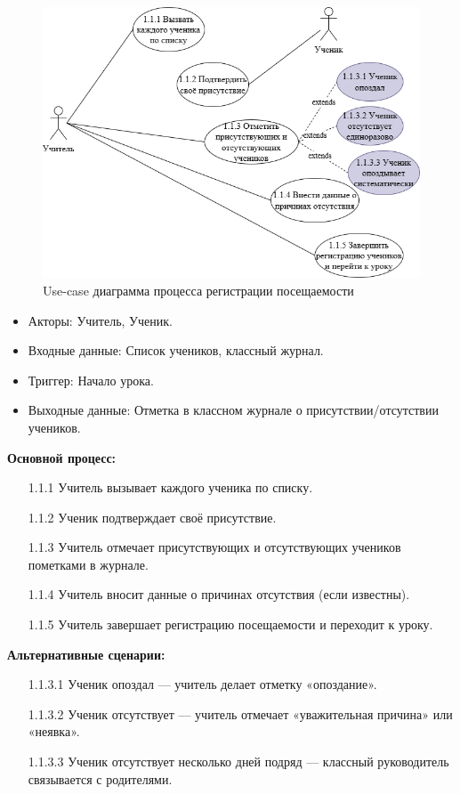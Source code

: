 \documentclass[a4paper, final]{article}
\begin{document}
\begin{figure}[H]
   \centering
   \includegraphics[width=\linewidth]{use_case31.png}
   \caption{Use-case диаграмма процесса регистрации посещаемости}
   \label{img:use_case31}
\end{figure}

\begin{itemize}
  \item Акторы: Учитель, Ученик.
  \item Входные данные: Список учеников, классный журнал.
  \item Триггер: Начало урока.
  \item Выходные данные: Отметка в классном журнале о присутствии/отсутствии учеников.
\end{itemize}

\textbf{Основной процесс:}
\begin{enumerate}
  \item[1.1.1] Учитель вызывает каждого ученика по списку.
  \item[1.1.2] Ученик подтверждает своё присутствие.
  \item[1.1.3] Учитель отмечает присутствующих и отсутствующих учеников пометками в журнале.
  \item[1.1.4] Учитель вносит данные о причинах отсутствия (если известны).
  \item[1.1.5] Учитель завершает регистрацию посещаемости и переходит к уроку.
\end{enumerate}

\textbf{Альтернативные сценарии:}
\begin{itemize}
  \item[1.1.3.1] Ученик опоздал --- учитель делает отметку «опоздание».
  \item[1.1.3.2] Ученик отсутствует --- учитель отмечает «уважительная причина» или «неявка».
  \item[1.1.3.3] Ученик отсутствует несколько дней подряд --- классный руководитель связывается с родителями.
\end{itemize}
\end{document}
